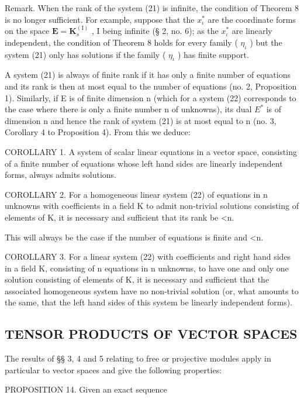 Remark. When the rank of the system (21) is infinite, the condition of Theorem 8 is no longer sufficient. For example, suppose that the \(x_{\iota}^{*}\) are the coordinate forms on the space \(\mathbf{E} = \mathbf{K}_{s}^{(\mathrm{I})}\) , I being infinite (§ 2, no. 6); as the \(x_{\iota}^{*}\) are linearly independent, the condition of Theorem 8 holds for every family ( \(\eta_{\iota}\) ) but the system (21) only has solutions if the family ( \(\eta_{\iota}\) ) has finite support.

A system (21) is always of finite rank if it has only a finite number of equations and its rank is then at most equal to the number of equations (no. 2, Proposition 1). Similarly, if E is of finite dimension n (which for a system (22) corresponds to the case where there is only a finite number n of unknowns), its dual \(E^{*}\) is of dimension n and hence the rank of system (21) is at most equal to n (no. 3, Corollary 4 to Proposition 4). From this we deduce:

COROLLARY 1. A system of scalar linear equations in a vector space, consisting of a finite number of equations whose left hand sides are linearly independent forms, always admits solutions.

COROLLARY 2. For a homogeneous linear system (22) of equations in n unknowns with coefficients in a field K to admit non-trivial solutions consisting of elements of K, it is necessary and sufficient that its rank be \textless n.

This will always be the case if the number of equations is finite and \textless n.

COROLLARY 3. For a linear system (22) with coefficients and right hand sides in a field K, consisting of n equations in n unknowns, to have one and only one solution consisting of elements of K, it is necessary and sufficient that the associated homogeneous system have no non-trivial solution (or, what amounts to the same, that the left hand sides of this system be linearly independent forms).

\subsection{TENSOR PRODUCTS OF VECTOR SPACES}

The results of §§ 3, 4 and 5 relating to free or projective modules apply in particular to vector spaces and give the following properties:

PROPOSITION 14. Given an exact sequence

